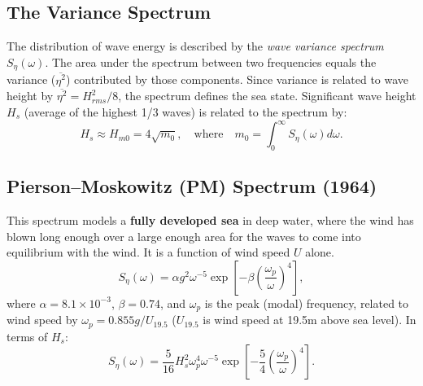 \documentclass[11pt,a4paper]{article}
\begin{document}
\subsection{The Variance Spectrum}
The distribution of wave energy is described by the \emph{wave variance spectrum} $S_\eta(\omega)$. The area under the spectrum between two frequencies equals the variance ($\overline{\eta^2}$) contributed by those components. Since variance is related to wave height by $\overline{\eta^2} = H_{rms}^2/8$, the spectrum defines the sea state. Significant wave height $H_s$ (average of the highest 1/3 waves) is related to the spectrum by:
\begin{equation}
H_s \approx H_{m0} = 4\sqrt{m_0}, \quad \text{where} \quad m_0 = \int_0^\infty S_\eta(\omega)  d\omega.
\end{equation}

\subsection{Pierson–Moskowitz (PM) Spectrum (1964)}
This spectrum models a \textbf{fully developed sea} in deep water, where the wind has blown long enough over a large enough area for the waves to come into equilibrium with the wind. It is a function of wind speed $U$ alone.
\begin{equation}
S_\eta(\omega) = \alpha g^2 \omega^{-5} \exp\left[-\beta \left(\frac{\omega_p}{\omega}\right)^4\right],
\end{equation}
where $\alpha = 8.1\times10^{-3}$, $\beta=0.74$, and $\omega_p$ is the peak (modal) frequency, related to wind speed by $\omega_p = 0.855 g / U_{19.5}$ ($U_{19.5}$ is wind speed at 19.5m above sea level). In terms of $H_s$:
\begin{equation}
S_\eta(\omega) = \frac{5}{16} H_s^2 \omega_p^4 \omega^{-5} \exp\left[-\frac{5}{4}\left(\frac{\omega_p}{\omega}\right)^4\right].
\end{equation}
\end{document}
